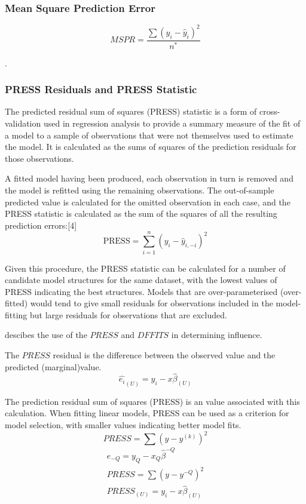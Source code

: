 \documentclass[12pt, a4paper]{report}
\theoremstyle{plain}
\theoremstyle{definition}
\theoremstyle{remark}
\begin{document}
	\subsubsection{Mean Square Prediction Error}
	\begin{equation}
	MSPR = \frac{\sum (y_{i}-\hat{y}_{i})^2}{n^*}
	\end{equation}
	

.

	
	\subsubsection{PRESS Residuals and PRESS Statistic}
	The predicted residual sum of squares (PRESS) statistic is a form of cross-validation used in regression analysis to provide a summary measure of the fit of a model to a sample of observations that were not themselves used to estimate the model. It is calculated as the sums of squares of the prediction residuals for those observations.
	
	A fitted model having been produced, each observation in turn is removed and the model is refitted using the remaining observations. The out-of-sample predicted value is calculated for the omitted observation in each case, and the PRESS statistic is calculated as the sum of the squares of all the resulting prediction errors:[4]
	\[\mbox{PRESS} =\sum_{i=1}^n (y_i - \hat{y}_{i, -i})^2 \]

	Given this procedure, the PRESS statistic can be calculated for a number of candidate model structures for the same dataset, with the lowest values of PRESS indicating the best structures. Models that are over-parameterised (over-fitted) would tend to give small residuals for observations included in the model-fitting but large residuals for observations that are excluded.
	


	\citet{schabenberger} descibes the use of the $PRESS$ and $DFFITS$ in determining influence.
	
	The $PRESS$ residual is the difference between the observed value and the predicted (marginal)value.
	\begin{equation}
	\hat{e_{i}}_{(U)} = y_{i} - x\hat{\beta}_{(U)}
	\end{equation}
	
	The prediction residual sum of squares (PRESS) is an value associated with this calculation. When fitting linear models, PRESS can be used as a criterion for model selection, with smaller values indicating better model fits.
	\begin{equation}
	PRESS = \sum(y-y^{(k)})^2
	\end{equation}
	\begin{eqnarray*}
		e_{-Q} = y_{Q} - x_{Q}\hat{\beta}^{-Q}\\
		PRESS = \sum(y-y^{-Q})^2\\
		PRESS_{(U)} = y_{i} - x\hat{\beta}_{(U)}\\
	\end{eqnarray*}
	
\end{document}
